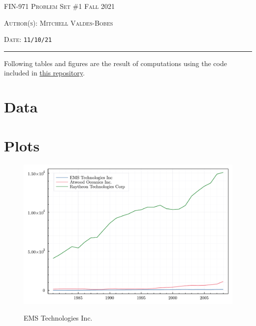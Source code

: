 \documentclass[12pt]{amsart}
\begin{document}
\thispagestyle{empty}


{\scshape FIN-971} \hfill {\scshape \Large Problem Set \#1} \hfill {\scshape Fall 2021}\\
{\scshape Author(s): \hfill Mitchell Valdes-Bobes\\
{\scshape Date: \hfill \texttt{11/10/21}
\medskip

\hrule

\bigskip

\bigskip

\date{\today}

\begin{exercise}
  Following tables and figures are the result of computations using the code included in \href{https://github.com/mitchv34/FIN-971/blob/main/PS1/src/source.jl}{this repository}.


\section{Data}
\begin{center}
  
\end{center}

\section{Plots}

\begin{figure}[h!]
  
  \centering
  
  \includegraphics[scale=0.7]{figures/fig_1.pdf}

\end{figure}
\newpage
\begin{figure}[h!]\caption{EMS Technologies Inc.}
  

\end{figure}
\end{exercise}}}
\end{document}
